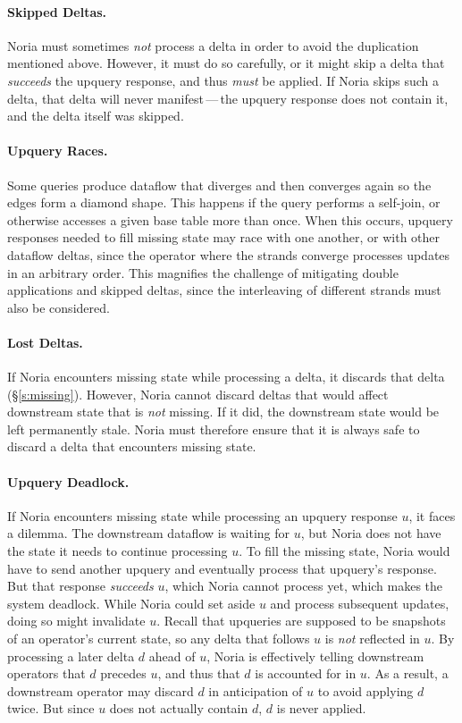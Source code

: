 \paragraph{Skipped Deltas.}
Noria must sometimes \emph{not} process a delta in order to avoid the
duplication mentioned above. However, it must do so carefully, or it might skip
a delta that \emph{succeeds} the upquery response, and thus \emph{must} be
applied. If Noria skips such a delta, that delta will never manifest\,---\,the
upquery response does not contain it, and the delta itself was skipped.

\paragraph{Upquery Races.}
Some queries produce dataflow that diverges and then converges again so the
edges form a diamond shape. This happens if the query performs a self-join, or
otherwise accesses a given base table more than once. When this occurs, upquery
responses needed to fill missing state may race with one another, or with other
dataflow deltas, since the operator where the strands converge processes updates
in an arbitrary order. This magnifies the challenge of mitigating double
applications and skipped deltas, since the interleaving of different strands
must also be considered.

\paragraph{Lost Deltas.}
If Noria encounters missing state while processing a delta, it discards that
delta (\S\ref{s:missing}). However, Noria cannot discard deltas that would
affect downstream state that is \emph{not} missing. If it did, the downstream
state would be left permanently stale. Noria must therefore ensure that it is
always safe to discard a delta that encounters missing state.

\paragraph{Upquery Deadlock.}
If Noria encounters missing state while processing an upquery response $u$, it
faces a dilemma. The downstream dataflow is waiting for $u$, but Noria does not
have the state it needs to continue processing $u$. To fill the missing state,
Noria would have to send another upquery and eventually process that upquery's
response. But that response \emph{succeeds} $u$, which Noria cannot process yet,
which makes the system deadlock. While Noria could set aside $u$ and process
subsequent updates, doing so might invalidate $u$. Recall that upqueries are
supposed to be snapshots of an operator's current state, so any delta that
follows $u$ is \emph{not} reflected in $u$. By processing a later delta $d$
ahead of $u$, Noria is effectively telling downstream operators that $d$
precedes $u$, and thus that $d$ is accounted for in $u$. As a result, a
downstream operator may discard $d$ in anticipation of $u$ to avoid applying $d$
twice. But since $u$ does not actually contain $d$, $d$ is never applied.

